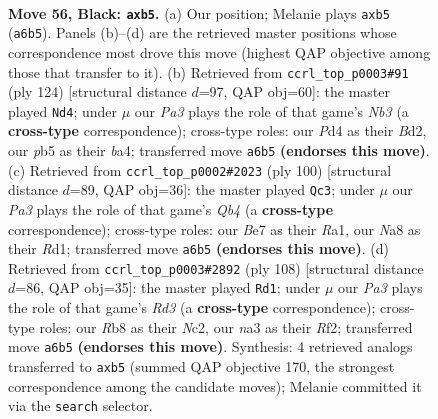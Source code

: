 \documentclass[11pt]{article}
\begin{document}
\clearpage

\begin{figure}[p]\centering
\begin{subfigure}{0.46\textwidth}\centering
\resizebox{\linewidth}{!}{%
\newchessgame
\chessboard[
  setfen={nr4k1/3qbr2/p3n3/PPp2p1p/3p1Pp1/N5P1/QR1BP2P/2RN2K1 b - - 0 56},
  showmover=false,
  pgfstyle=straightmove, color=movearrow, markmove={a6-b5}
]}
\caption{}
\end{subfigure}\hfill
\begin{subfigure}{0.46\textwidth}\centering
\resizebox{\linewidth}{!}{%
\newchessgame
\chessboard[
  setfen={2r3r1/pk3pq1/1p2p2p/3nP2P/b1p1R1P1/PNP2R1K/2PBQ3/8 w - - 39 63},
  showmover=false,
  pgfstyle=straightmove, color=movearrow, markmove={b3-d4}
]}
\caption{}
\end{subfigure}
\\[4pt]
\begin{subfigure}{0.46\textwidth}\centering
\resizebox{\linewidth}{!}{%
\newchessgame
\chessboard[
  setfen={4r1k1/1b3p2/1q3rp1/1Pnp3p/pQpN3P/P3P1P1/5PB1/R2R2K1 w - - 43 51},
  showmover=false,
  pgfstyle=straightmove, color=movearrow, markmove={b4-c3}
]}
\caption{}
\end{subfigure}\hfill
\begin{subfigure}{0.46\textwidth}\centering
\resizebox{\linewidth}{!}{%
\newchessgame
\chessboard[
  setfen={1q6/5p1k/rr1pb1p1/2n1p2p/1pP1P2P/1B1R1P2/P1N2RP1/4Q2K w - - 1 55},
  showmover=false,
  pgfstyle=straightmove, color=movearrow, markmove={d3-d1}
]}
\caption{}
\end{subfigure}
\caption{\textbf{Move 56, Black: \texttt{axb5}.} (a) Our position; Melanie plays \texttt{axb5} (\texttt{a6b5}). Panels (b)--(d) are the retrieved master positions whose correspondence most drove this move (highest QAP objective among those that transfer to it). (b) Retrieved from \texttt{ccrl\_top\_p0003\#91} (ply 124) [structural distance $d$=97, QAP obj=60]: the master played \texttt{Nd4}; under $\mu$ our \emph{Pa3} plays the role of that game's \emph{Nb3} (a \textbf{cross-type} correspondence); cross-type roles: our \emph{P}d4 as their \emph{B}d2, our \emph{p}b5 as their \emph{b}a4; transferred move \texttt{a6b5} \textbf{(endorses this move)}. (c) Retrieved from \texttt{ccrl\_top\_p0002\#2023} (ply 100) [structural distance $d$=89, QAP obj=36]: the master played \texttt{Qc3}; under $\mu$ our \emph{Pa3} plays the role of that game's \emph{Qb4} (a \textbf{cross-type} correspondence); cross-type roles: our \emph{B}e7 as their \emph{R}a1, our \emph{N}a8 as their \emph{R}d1; transferred move \texttt{a6b5} \textbf{(endorses this move)}. (d) Retrieved from \texttt{ccrl\_top\_p0003\#2892} (ply 108) [structural distance $d$=86, QAP obj=35]: the master played \texttt{Rd1}; under $\mu$ our \emph{Pa3} plays the role of that game's \emph{Rd3} (a \textbf{cross-type} correspondence); cross-type roles: our \emph{R}b8 as their \emph{N}c2, our \emph{n}a3 as their \emph{R}f2; transferred move \texttt{a6b5} \textbf{(endorses this move)}. Synthesis: 4 retrieved analogs transferred to \texttt{axb5} (summed QAP objective 170, the strongest correspondence among the candidate moves); Melanie committed it via the \texttt{search} selector.}
\label{fig:thought-m111}
\end{figure}
\end{document}
